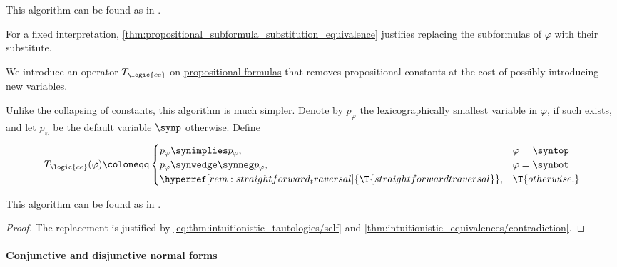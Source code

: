 \begin{comments}
  \item This algorithm can be found as  in \cite{notebook:code}.
\end{comments}
\begin{defproof}
  For a fixed interpretation, \cref{thm:propositional_subformula_substitution_equivalence} justifies replacing the subformulas of \( \varphi \) with their substitute.
\end{defproof}

\begin{algorithm}\label{alg:propositional_constant_expansion}
  We introduce an operator \( T_{\logic{ce}} \) on \hyperref[def:propositional_formula]{propositional formulas} that removes propositional constants at the cost of possibly introducing new variables.

  Unlike the collapsing of constants, this algorithm is much simpler. Denote by \( p_\varphi \) the lexicographically smallest variable in \( \varphi \), if such exists, and let \( p_\varphi \) be the default variable \( \synp \) otherwise. Define
  \begin{equation*}
    T_{\logic{ce}}(\varphi) \coloneqq \begin{cases}
      p_\varphi \synimplies p_\varphi,       &\varphi = \syntop \\
      p_\varphi \synwedge \synneg p_\varphi, &\varphi = \synbot \\
      \hyperref[rem:straightforward_traversal]{\T{straightforward traversal}}, &\T{otherwise.}
    \end{cases}
  \end{equation*}
\end{algorithm}
\begin{comments}
  \item This algorithm can be found as  in \cite{notebook:code}.
\end{comments}
\begin{proof}
  The replacement is justified by \eqref{eq:thm:intuitionistic_tautologies/self} and \cref{thm:intuitionistic_equivalences/contradiction}.
\end{proof}

\paragraph{Conjunctive and disjunctive normal forms}

